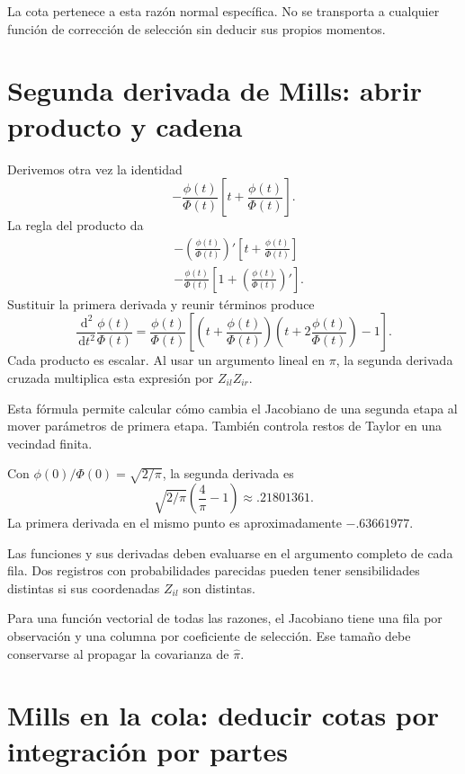 \documentclass[11pt,a4paper]{article}
\newcommand{\dd}{\,\mathrm d}
\begin{document}
La cota pertenece a esta
razón normal específica.
No se transporta a cualquier
función de corrección de selección
sin deducir sus propios momentos.


\clearpage
\section{Segunda derivada de Mills: abrir producto y cadena}

Derivemos otra vez la identidad
\[
-\frac{\phi(t)}{\Phi(t)}
\left[t+\frac{\phi(t)}{\Phi(t)}\right].
\]
La regla del producto da
\[
\begin{aligned}
&-\left(\frac{\phi(t)}{\Phi(t)}\right)'
\left[t+\frac{\phi(t)}{\Phi(t)}\right]\\
&-\frac{\phi(t)}{\Phi(t)}
\left[1+\left(\frac{\phi(t)}{\Phi(t)}\right)'\right].
\end{aligned}
\]
Sustituir la primera derivada
y reunir términos produce
\[
\boxed{
\frac{\dd^2}{\dd t^2}\frac{\phi(t)}{\Phi(t)}
=\frac{\phi(t)}{\Phi(t)}
\left[
\left(t+\frac{\phi(t)}{\Phi(t)}\right)
\left(t+2\frac{\phi(t)}{\Phi(t)}\right)-1
\right]}.
\]
Cada producto es escalar.
Al usar un argumento lineal en \(\pi\),
la segunda derivada cruzada multiplica
esta expresión por \(Z_{il}Z_{ir}\).

Esta fórmula permite calcular
cómo cambia el Jacobiano de
una segunda etapa al mover
parámetros de primera etapa.
También controla restos de Taylor
en una vecindad finita.

\begin{ejemplo}
Con \(\phi(0)/\Phi(0)=\sqrt{2/\pi}\),
la segunda derivada es
\[
\sqrt{2/\pi}\left(\frac4\pi-1\right)
\approx.21801361.
\]
La primera derivada en el mismo punto
es aproximadamente \(-.63661977\).
\end{ejemplo}
Las funciones y sus derivadas
deben evaluarse en el argumento
completo de cada fila.
Dos registros con probabilidades
parecidas pueden tener sensibilidades
distintas si sus coordenadas
\(Z_{il}\) son distintas.

Para una función vectorial
de todas las razones,
el Jacobiano tiene una fila
por observación y una columna
por coeficiente de selección.
Ese tamaño debe conservarse
al propagar la covarianza de \(\widehat\pi\).


\clearpage
\section{Mills en la cola: deducir cotas por integración por partes}
\end{document}
